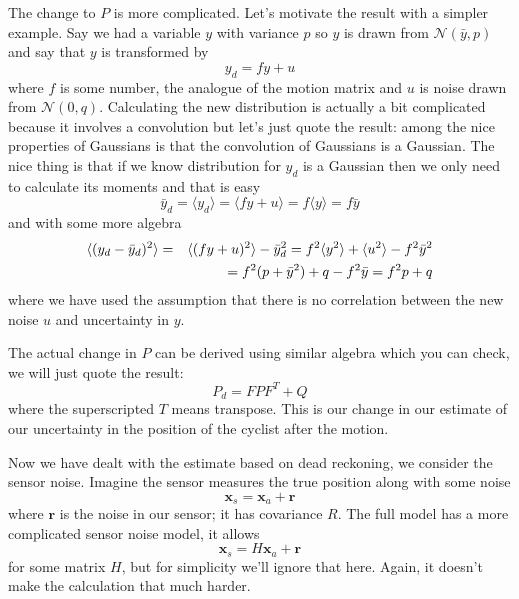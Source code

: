 \documentclass[12pt]{article}
\begin{document}
The change to $P$ is more complicated. Let's motivate the result with a
simpler example. Say we had a variable $y$ with variance $p$ so $y$ is
drawn from $\mathcal{N}(\bar{y},p)$ and say that $y$ is transformed by 
\begin{equation}
y_d=fy+u
\end{equation}
where $f$ is some number, the analogue of the motion matrix and $u$ is
noise drawn from $\mathcal{N}(0,q)$. Calculating the new distribution
is actually a bit complicated because it involves a convolution but
let's just quote the result: among the nice properties of Gaussians is
that the convolution of Gaussians is a Gaussian. The nice thing is
that if we know distribution for $y_d$ is a Gaussian then we only need
to calculate its moments and that is easy
\begin{equation}
\bar{y}_d=\langle y_d\rangle =\langle fy+u\rangle=f\langle y\rangle=f\bar{y}
\end{equation}
and with some more algebra
\begin{eqnarray}
\langle (y_d-\bar{y}_d)^2\rangle &=&\langle (fy+u)^2 \rangle-\bar{y}_d^2=f^2\langle y^2\rangle+\langle u^2\rangle -f^2\bar{y}^2\cr
&&=f^2(p+\bar{y}^2)+q-f^2\bar{y}=f^2p+q
\end{eqnarray}
where we have used the assumption that there is no correlation
between the new noise $u$ and uncertainty in $y$.

The actual change in $P$ can be derived using similar algebra which
you can check, we will just quote the result:
\begin{equation}
P_d=FPF^T+Q
\end{equation}
where the superscripted $T$ means transpose. This is our change in our
estimate of our uncertainty in the position of the cyclist after the
motion.

Now we have dealt with the estimate based on dead reckoning, we
consider the sensor noise. Imagine the sensor measures the true
position along with some noise
\begin{equation}
\mathbf{x}_s=\mathbf{x}_a+\mathbf{r}
\end{equation}
where $\mathbf{r}$ is the noise in our sensor; it has covariance $R$. The full model has a more complicated sensor noise model, it allows
\begin{equation}
\mathbf{x}_s=H\mathbf{x}_a+\mathbf{r}
\end{equation}
for some matrix $H$, but for simplicity we'll ignore that here. Again,
it doesn't make the calculation that much harder. 
\end{document}
